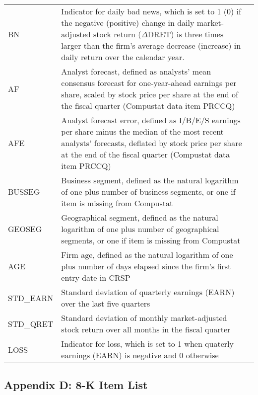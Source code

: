 \begin{table}[H]
\begin{tabular}{lp{15cm}p{15cm}}
		BN & Indicator for daily bad news, which is set to 1 (0) if the negative (positive) change in daily market-adjusted stock return ($\Delta$DRET) is three times larger than the firm’s average decrease (increase) in daily return over the calendar year.\\
		AF & Analyst forecast, defined as analysts' mean consensus forecast for one-year-ahead earnings per share, scaled by stock price per share at the end of the fiscal quarter (Compustat data item PRCCQ)\\
		AFE & Analyst forecast error, defined as I/B/E/S earnings per share minus the median of the most recent analysts' forecasts, deflated by stock price per share at the end of the fiscal quarter (Compustat data item PRCCQ)\\
		BUSSEG & Business segment, defined as the natural logarithm of one plus number of business segments, or one if item is missing from Compustat\\
		GEOSEG & Geographical segment, defined as the natural logarithm of one plus number of geographical segments, or one if item is missing from Compustat\\
		AGE & Firm age, defined as the natural logarithm of one plus number of days elapsed since the firm's first entry date in CRSP\\
		STD\_EARN & Standard deviation of quarterly earnings (EARN) over the last five quarters\\
		STD\_QRET & Standard deviation of monthly market-adjusted stock return over all months in the fiscal quarter\\
		LOSS & Indicator for loss, which is set to 1 when quaterly earnings (EARN) is negative and 0 otherwise\\
	\end{tabular}%
\end{table}%
\newpage
\subsection*{Appendix D: 8-K Item List}
\label{appd}
